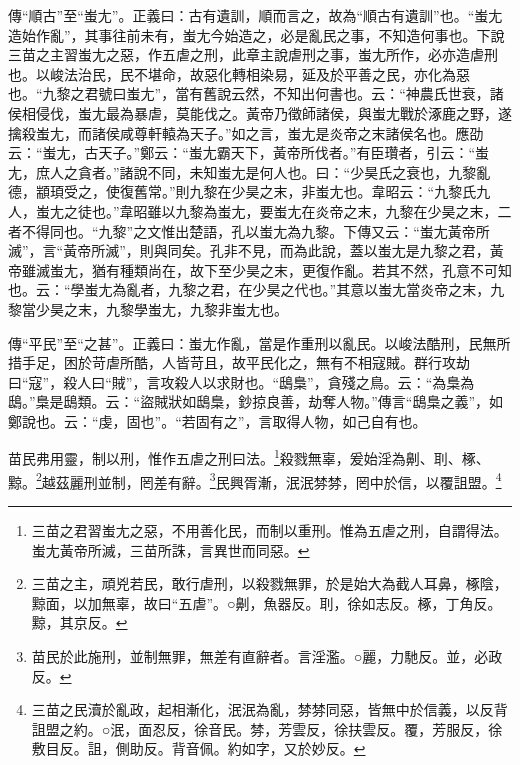 {\noindent\zhuan{}\fzbyks 傳“順古”至“蚩尢”。正義曰：古有遺訓，順而言之，故為“順古有遺訓”也。“蚩尢造始作亂”，其事往前未有，蚩尢今始造之，必是亂民之事，不知造何事也。下說三苗之主習蚩尢之惡，作五虐之刑，此章主說虐刑之事，蚩尢所作，必亦造虐刑也。以峻法治民，民不堪命，故惡化轉相染易，延及於平善之民，亦化為惡也。“九黎之君號曰蚩尢”，當有舊說云然，不知出何書也。云：“神農氏世衰，諸侯相侵伐，蚩尢最為暴虐，莫能伐之。黃帝乃徵師諸侯，與蚩尢戰於涿鹿之野，遂擒殺蚩尢，而諸侯咸尊軒轅為天子。”如之言，蚩尢是炎帝之末諸侯名也。應劭云：“蚩尢，古天子。”鄭云：“蚩尢霸天下，黃帝所伐者。”有臣瓚者，引云：“蚩尢，庶人之貪者。”諸說不同，未知蚩尢是何人也。曰：“少昊氏之衰也，九黎亂德，顓頊受之，使復舊常。”則九黎在少昊之末，非蚩尢也。韋昭云：“九黎氏九人，蚩尢之徒也。”韋昭雖以九黎為蚩尢，要蚩尢在炎帝之末，九黎在少昊之末，二者不得同也。“九黎”之文惟出楚語，孔以蚩尢為九黎。下傳又云：“蚩尢黃帝所滅”，言“黃帝所滅”，則與同矣。孔非不見，而為此說，蓋以蚩尢是九黎之君，黃帝雖滅蚩尢，猶有種類尚在，故下至少昊之末，更復作亂。若其不然，孔意不可知也。云：“學蚩尢為亂者，九黎之君，在少昊之代也。”其意以蚩尢當炎帝之末，九黎當少昊之末，九黎學蚩尢，九黎非蚩尢也。 \par}

{\noindent\zhuan{}\fzbyks 傳“平民”至“之甚”。正義曰：蚩尢作亂，當是作重刑以亂民。以峻法酷刑，民無所措手足，困於苛虐所酷，人皆苛且，故平民化之，無有不相寇賊。群行攻劫曰“寇”，殺人曰“賊”，言攻殺人以求財也。“鴟梟”，貪殘之鳥。云：“為梟為鴟。”梟是鴟類。云：“盜賊狀如鴟梟，鈔掠良善，劫奪人物。”傳言“鴟梟之義”，如鄭說也。云：“虔，固也”。“若固有之”，言取得人物，如己自有也。 \par}

苗民弗用靈，制以刑，惟作五虐之刑曰法。\footnote{三苗之君習蚩尢之惡，不用善化民，而制以重刑。惟為五虐之刑，自謂得法。蚩尢黃帝所滅，三苗所誅，言異世而同惡。}殺戮無辜，爰始淫為劓、刵、椓、黥。\footnote{三苗之主，頑兇若民，敢行虐刑，以殺戮無罪，於是始大為截人耳鼻，椓陰，黥面，以加無辜，故曰“五虐”。○劓，魚器反。刵，徐如志反。椓，丁角反。黥，其京反。}越茲麗刑並制，罔差有辭。\footnote{苗民於此施刑，並制無罪，無差有直辭者。言淫濫。○麗，力馳反。並，必政反。}民興胥漸，泯泯棼棼，罔中於信，以覆詛盟。\footnote{三苗之民瀆於亂政，起相漸化，泯泯為亂，棼棼同惡，皆無中於信義，以反背詛盟之約。○泯，面忍反，徐音民。棼，芳雲反，徐扶雲反。覆，芳服反，徐敷目反。詛，側助反。背音佩。約如字，又於妙反。}


